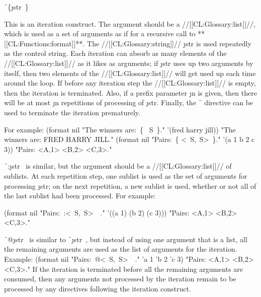 \endsubsubsection%

 

\f{~\{\j{str}~\}}

This is an iteration construct.  The argument should be a //[[CL:Glossary:list]]//, which is used as a set of arguments  as if for a recursive call to **[[CL:Functions:format]]**. The //[[CL:Glossary:string]]// \j{str} is used repeatedly as the control string. Each iteration can absorb as many elements of the //[[CL:Glossary:list]]// as it likes as arguments; if \j{str} uses up two arguments by itself, then two elements of the //[[CL:Glossary:list]]// will get used up each time around the loop. If before any iteration step the //[[CL:Glossary:list]]//  is empty, then the iteration is terminated. Also, if a prefix parameter \j{n} is given, then there will be at most \j{n} repetitions of processing of \j{str}.   Finally, the \f{~\hat } directive can be used to terminate the iteration prematurely.

For example:
                                                                        \code
 (format nil "The winners are:~\{ ~S~\}." 
         '(fred harry jill))  \EV "The winners are: FRED HARRY JILL."                           
 (format nil "Pairs:~\{ <~S,~S>~\}." 
         '(a 1 b 2 c 3)) \EV "Pairs: <A,1> <B,2> <C,3>." \endcode

\f{~:\lbr \j{str}~\rbr  } is similar,  but the argument should be a //[[CL:Glossary:list]]// of sublists. At each repetition step, one sublist  is used as the set of arguments for processing \j{str}; on the next repetition, a new sublist  is used, whether or not all of the last sublist had been processed.   For example:

                                                                               

\code
 (format nil "Pairs:~:\lbr <~S,~S>~\rbr\ ." 
                 '((a 1) (b 2) (c 3))) \EV "Pairs: <A,1> <B,2> <C,3>." \endcode

\f{~@\lbr \j{str}~\rbr } is similar to \f{~\lbr \j{str}~\rbr  }, but instead of using one argument that is a list, all the remaining arguments are used as the list of arguments for the iteration. Example:
                                     \code
 (format nil "Pairs:~@\lbr <~S,~S>~\rbr\ ." 'a 1 'b 2 'c 3) \EV "Pairs: <A,1> <B,2> <C,3>." \endcode If the iteration is terminated before all the remaining arguments are consumed, then any arguments not processed by the iteration remain to be processed by any directives following the iteration construct.

